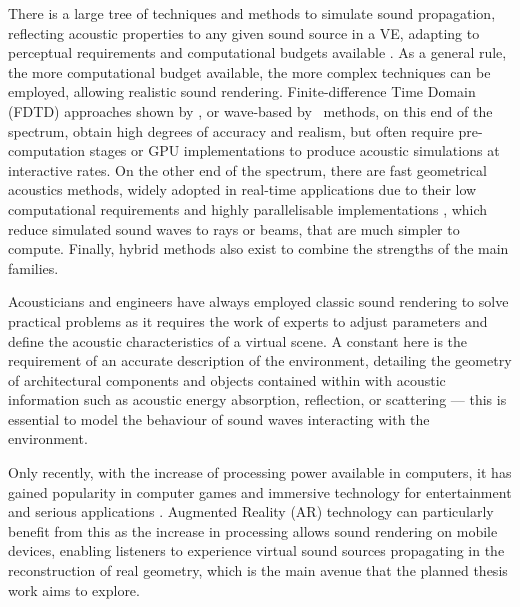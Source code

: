 There is a large tree of techniques and methods to simulate sound propagation, reflecting acoustic properties to any given sound source in a VE, adapting to perceptual requirements and computational budgets available \cite{doukakis2019audio}. As a general rule, the more computational budget available, the more complex techniques can be employed, allowing realistic sound rendering. Finite-difference Time Domain (FDTD) approaches shown by \cite{hamilton2017fdtd}, or wave-based by~\cite{raghuvanshi2014parametric} methods, on this end of the spectrum, obtain high degrees of accuracy and realism, but often require pre-computation stages or GPU implementations to produce acoustic simulations at interactive rates. On the other end of the spectrum, there are fast geometrical acoustics methods, widely adopted in real-time applications due to their low computational requirements and highly parallelisable implementations \citep{cowan2010gpu}, which reduce simulated sound waves to rays or beams, that are much simpler to compute. Finally, hybrid methods also exist to combine the strengths of the main families. \par
Acousticians and engineers have always employed classic sound rendering to solve practical problems as it requires the work of experts to adjust parameters and define the acoustic characteristics of a virtual scene. A constant here is the requirement of an accurate description of the environment, detailing the geometry of architectural components and objects contained within with acoustic information such as acoustic energy absorption, reflection, or scattering --- this is essential to model the behaviour of sound waves interacting with the environment. \par
Only recently, with the increase of processing power available in computers, it has gained popularity in computer games and immersive technology for entertainment and serious applications \citep{zhang18}. Augmented Reality (AR) technology can particularly benefit from this as the increase in processing allows sound rendering on mobile devices, enabling listeners to experience virtual sound sources propagating in the reconstruction of real geometry, which is the main avenue that the planned thesis work aims to explore. \par


